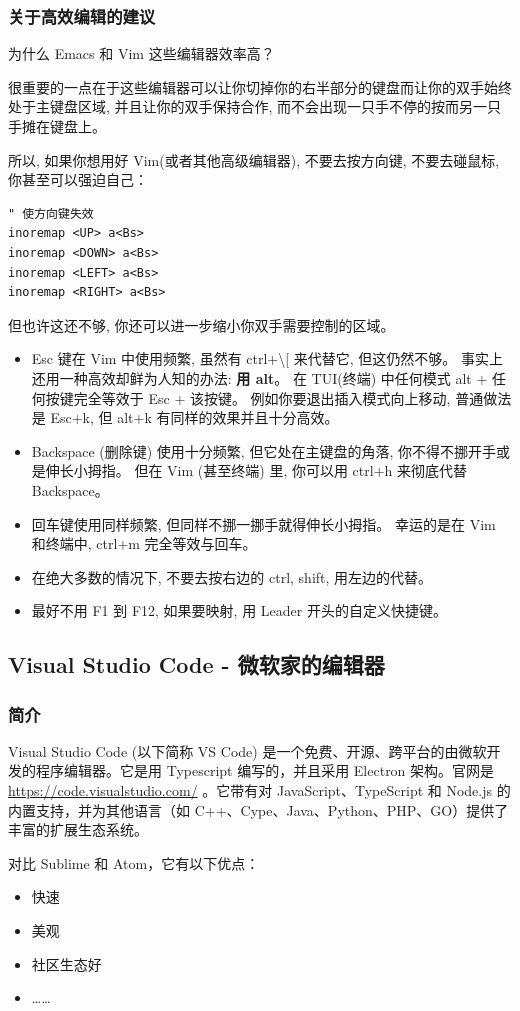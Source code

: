\subsubsection{关于高效编辑的建议}

为什么 Emacs 和 Vim 这些编辑器效率高？  

很重要的一点在于这些编辑器可以让你切掉你的右半部分的键盘而让你的双手始终处于主键盘区域, 并且让你的双手保持合作, 而不会出现一只手不停的按而另一只手摊在键盘上。  

所以, 如果你想用好 Vim(或者其他高级编辑器), 不要去按方向键, 不要去碰鼠标, 你甚至可以强迫自己：  

\begin{verbatim}
" 使方向键失效
inoremap <UP> a<Bs>
inoremap <DOWN> a<Bs>
inoremap <LEFT> a<Bs>
inoremap <RIGHT> a<Bs>
\end{verbatim}

但也许这还不够, 你还可以进一步缩小你双手需要控制的区域。  

\begin{itemize}
\item Esc 键在 Vim 中使用频繁, 虽然有 ctrl+\textbackslash{}[ 来代替它, 但这仍然不够。  
事实上还用一种高效却鲜为人知的办法: \textbf{用 alt}。  
在 TUI(终端) 中任何模式 alt + 任何按键完全等效于 Esc + 该按键。  
例如你要退出插入模式向上移动, 普通做法是 Esc+k, 但 alt+k 有同样的效果并且十分高效。  
\item Backspace (删除键) 使用十分频繁, 但它处在主键盘的角落, 你不得不挪开手或是伸长小拇指。  
但在 Vim (甚至终端) 里, 你可以用 ctrl+h 来彻底代替 Backspace。  
\item 回车键使用同样频繁, 但同样不挪一挪手就得伸长小拇指。  
幸运的是在 Vim 和终端中, ctrl+m 完全等效与回车。  
\item 在绝大多数的情况下, 不要去按右边的 ctrl, shift, 用左边的代替。  
\item 最好不用 F1 到 F12, 如果要映射, 用 Leader 开头的自定义快捷键。  
\end{itemize}

\subsection{Visual Studio Code - 微软家的编辑器}

\subsubsection{简介}

Visual Studio Code (以下简称 VS Code) 是一个免费、开源、跨平台的由微软开发的程序编辑器。它是用 Typescript 编写的，并且采用 Electron 架构。官网是 \url{https://code.visualstudio.com/} 。它带有对 JavaScript、TypeScript 和 Node.js 的内置支持，并为其他语言（如 C++、Cype、Java、Python、PHP、GO）提供了丰富的扩展生态系统。

对比 Sublime 和 Atom，它有以下优点：

\begin{itemize}
\item 快速
\item 美观
\item 社区生态好
\item ……
\end{itemize}
